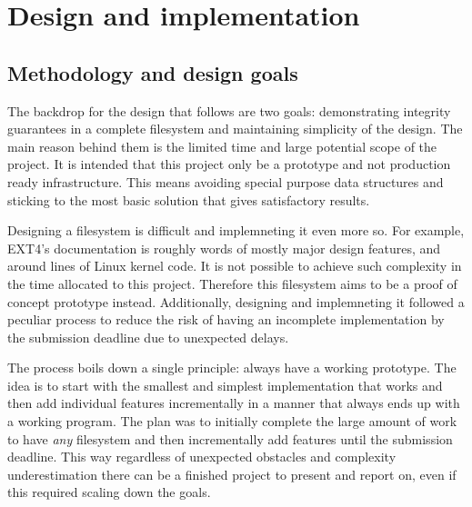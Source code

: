 \chapter{Design and implementation}
    \label{ch:design}

    \section{Methodology and design goals}
        \label{sec:methodology}


        The backdrop for the design that follows are two goals: demonstrating
        integrity guarantees in a complete filesystem and maintaining
        simplicity of the design. The main reason behind them is the limited
        time and large potential scope of the project. It is intended that this
        project only be a prototype and not production ready infrastructure.
        This means avoiding special purpose data structures and sticking to the
        most basic solution that gives satisfactory results.

        Designing a filesystem is difficult and implemneting it even more so.
        For example, EXT4's documentation \cite{ext4_docs} is roughly
         words of mostly major design features, and around
         lines of Linux kernel code. It is not possible to
        achieve such complexity in the time allocated to this project.
        Therefore this filesystem aims to be a proof of concept prototype
        instead. Additionally, designing and implemneting it followed a
        peculiar process to reduce the risk of having an incomplete
        implementation by the submission deadline due to unexpected delays.

        The process boils down a single principle: always have a working
        prototype. The idea is to start with the smallest and simplest
        implementation that works and then add individual features
        incrementally in a manner that always ends up with a working program.
        The plan was to initially complete the large amount of work to have
        \textit{any} filesystem and then incrementally add features until the
        submission deadline. This way regardless of unexpected obstacles and
        complexity underestimation there can be a finished project to present
        and report on, even if this required scaling down the goals.



